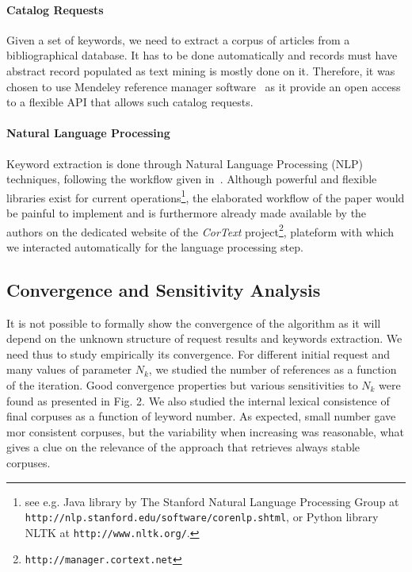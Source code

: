 \paragraph{Catalog Requests}
Given a set of keywords, we need to extract a corpus of articles from a bibliographical database. It has to be done automatically and records must have abstract record populated as text mining is mostly done on it. Therefore, it was chosen to use Mendeley reference manager software~\cite{mendeley} as it provide an open access to a flexible API that allows such catalog requests.


\paragraph{Natural Language Processing}
Keyword extraction is done through Natural Language Processing (NLP) techniques, following the workflow given in~\cite{chavalarias2013phylomemetic}. Although powerful and flexible libraries exist for current operations\footnote{see e.g. Java library by The Stanford Natural Language Processing Group at \texttt{http://nlp.stanford.edu/software/corenlp.shtml}, or Python library NLTK at \texttt{http://www.nltk.org/}.}, the elaborated workflow of the paper would be painful to implement and is furthermore already made available by the authors on the dedicated website of the \emph{CorText} project\footnote{\texttt{http://manager.cortext.net}}, plateform with which we interacted automatically for the language processing step.


\subsection{Convergence and Sensitivity Analysis}

It is not possible to formally show the convergence of the algorithm as it will depend on the unknown structure of request results and keywords extraction. We need thus to study empirically its convergence. For different initial request and many values of parameter $N_k$, we studied the number of references as a function of the iteration. Good convergence properties but various sensitivities to $N_k$ were found as presented in Fig. 2. We also studied the internal lexical consistence of final corpuses as a function of leyword number. As expected, small number gave mor consistent corpuses, but the variability when increasing was reasonable, what gives a clue on the relevance of the approach that retrieves always stable corpuses.



